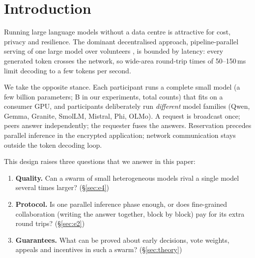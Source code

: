 \documentclass[11pt]{article}
\theoremstyle{definition}
\theoremstyle{remark}
\begin{document}
\section{Introduction}
Running large language models without a data centre is attractive for cost, privacy and resilience. The
dominant decentralised approach, pipeline-parallel serving of one large model over volunteers
\cite{borzunov2023petals,ryabinin2023swarm}, is bounded by latency: every generated token crosses the
network, so wide-area round-trip times of 50--150\,ms limit decoding to a few tokens per second.

We take the opposite stance. Each participant runs a complete small model (a few billion parameters;
\eSmallSizes{}B in our experiments, total counts) that fits on a consumer GPU, and participants deliberately run \emph{different} model families (Qwen, Gemma,
Granite, SmolLM, Mistral, Phi, OLMo). A request is broadcast once; peers answer independently; the
requester fuses the answers. Reservation precedes parallel inference in the encrypted application;
network communication stays outside the token decoding loop.

This design raises three questions that we answer in this paper:
\begin{enumerate}
\item \textbf{Quality.} Can a swarm of small heterogeneous models rival a single model several times
larger? (\S\ref{sec:e4})
\item \textbf{Protocol.} Is one parallel inference phase enough, or does fine-grained collaboration (writing the
answer together, block by block) pay for its extra round trips? (\S\ref{sec:e2})
\item \textbf{Guarantees.} What can be proved about early decisions, vote weights, appeals and incentives
in such a swarm? (\S\ref{sec:theory})
\end{enumerate}
\end{document}
